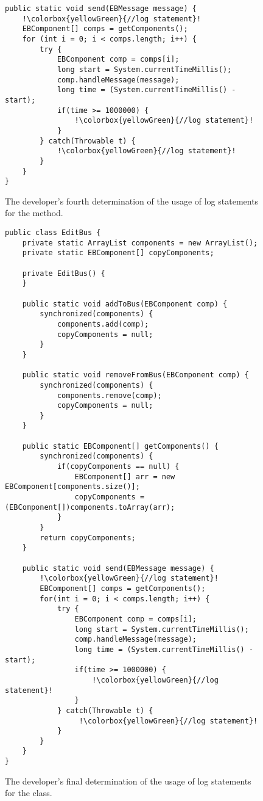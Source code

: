 \begin{figure}[p]
\def\baselinestretch{1}
\begin{lstlisting}[escapechar=!]
public static void send(EBMessage message) {
    !\colorbox{yellowGreen}{//log statement}!
    EBComponent[] comps = getComponents();
    for (int i = 0; i < comps.length; i++) {
        try {
            EBComponent comp = comps[i];
            long start = System.currentTimeMillis();
            comp.handleMessage(message);
            long time = (System.currentTimeMillis() - start);
            if(time >= 1000000) {
                !\colorbox{yellowGreen}{//log statement}!
            }
        } catch(Throwable t) {
            !\colorbox{yellowGreen}{//log statement}!
        }
    }
}
\end{lstlisting}
\caption[The developer's fourth determination of the usage of log statements.]{The developer's fourth determination of the usage of log statements for the  method.\label{ch2-ex-logged-m4}}
\end{figure}

\begin{figure}[p]
\def\baselinestretch{0.94}
\begin{lstlisting}[escapechar=!]
public class EditBus {
    private static ArrayList components = new ArrayList();
    private static EBComponent[] copyComponents;

    private EditBus() {
    }

    public static void addToBus(EBComponent comp) {
        synchronized(components) {
            components.add(comp);
            copyComponents = null;
        }
    }

    public static void removeFromBus(EBComponent comp) {
        synchronized(components) {
            components.remove(comp);
            copyComponents = null;
        }
    }

    public static EBComponent[] getComponents() {
        synchronized(components) {
            if(copyComponents == null) {
                EBComponent[] arr = new EBComponent[components.size()];
                copyComponents = (EBComponent[])components.toArray(arr);
            }
        }
        return copyComponents;
    }

    public static void send(EBMessage message) {
        !\colorbox{yellowGreen}{//log statement}!
        EBComponent[] comps = getComponents();
        for(int i = 0; i < comps.length; i++) {
            try {
                EBComponent comp = comps[i];
                long start = System.currentTimeMillis();
                comp.handleMessage(message);
                long time = (System.currentTimeMillis() - start);
                if(time >= 1000000) {
                    !\colorbox{yellowGreen}{//log statement}!
                }
            } catch(Throwable t) {
                 !\colorbox{yellowGreen}{//log statement}!
            }
        }
    }
}
\end{lstlisting}

\caption[The developer's final determination of the usage of log statements.]{The developer's final determination of the usage of log statements for the  class.\label{ch2-ex-logged}}
\end{figure}


